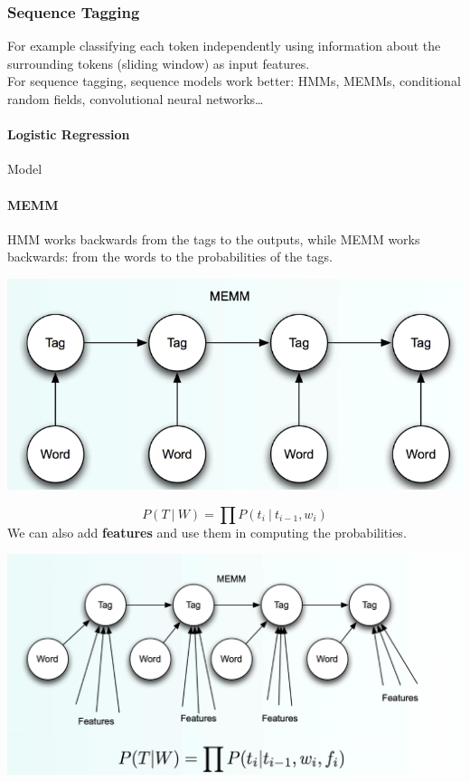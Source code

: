 \documentclass[10pt]{report}
\begin{document}
\subsubsection{Sequence Tagging} For example classifying each token independently using information about the surrounding tokens (sliding window) as input features.\\
For sequence tagging, sequence models work better: HMMs, MEMMs, conditional random fields, convolutional neural networks\ldots
\paragraph{Logistic Regression} Model %
\paragraph{MEMM} HMM works backwards from the tags to the outputs, while MEMM works backwards: from the words to the probabilities of the tags.
\begin{center}
	\includegraphics[scale=0.5]{16.png}
\end{center}
$$P(T\:|\:W) = \prod P(t_i\:|\:t_{i-1}, w_i)$$
We can also add \textbf{features} and use them in computing the probabilities.
\begin{center}
	\includegraphics[scale=0.33]{17.png}
\end{center}
\end{document}
